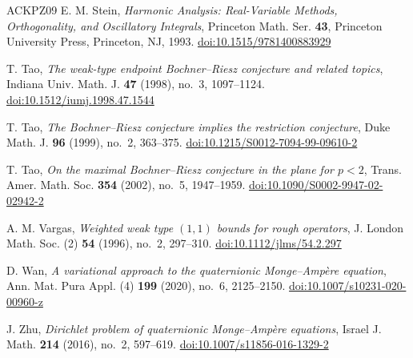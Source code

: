 \begin{thebibliography}{ACKPZ09}
 E. M. Stein, \emph{Harmonic Analysis: Real-Variable Methods, Orthogonality, and Oscillatory Integrals}, Princeton Math. Ser. \textbf{43}, Princeton University Press, Princeton, NJ, 1993. \href{https://doi.org/10.1515/9781400883929}{doi:10.1515/9781400883929}

 T. Tao, \emph{The weak-type endpoint Bochner--Riesz conjecture and related topics}, Indiana Univ. Math. J. \textbf{47} (1998), no.~3, 1097--1124. \href{https://doi.org/10.1512/iumj.1998.47.1544}{doi:10.1512/iumj.1998.47.1544}

 T. Tao, \emph{The Bochner--Riesz conjecture implies the restriction conjecture}, Duke Math. J. \textbf{96} (1999), no.~2, 363--375. \href{https://doi.org/10.1215/S0012-7094-99-09610-2}{doi:10.1215/S0012-7094-99-09610-2}

 T. Tao, \emph{On the maximal Bochner--Riesz conjecture in the plane for $p<2$}, Trans. Amer. Math. Soc. \textbf{354} (2002), no.~5, 1947--1959. \href{https://doi.org/10.1090/S0002-9947-02-02942-2}{doi:10.1090/S0002-9947-02-02942-2}

 A. M. Vargas, \emph{Weighted weak type $(1,1)$ bounds for rough operators}, J. London Math. Soc. (2) \textbf{54} (1996), no.~2, 297--310. \href{https://doi.org/10.1112/jlms/54.2.297}{doi:10.1112/jlms/54.2.297}

 D. Wan, \emph{A variational approach to the quaternionic Monge--Amp\`ere equation}, Ann. Mat. Pura Appl. (4) \textbf{199} (2020), no.~6, 2125--2150. \href{https://doi.org/10.1007/s10231-020-00960-z}{doi:10.1007/s10231-020-00960-z}

 J. Zhu, \emph{Dirichlet problem of quaternionic Monge--Amp\`ere equations}, Israel J. Math. \textbf{214} (2016), no.~2, 597--619. \href{https://doi.org/10.1007/s11856-016-1329-2}{doi:10.1007/s11856-016-1329-2}

\end{thebibliography}
